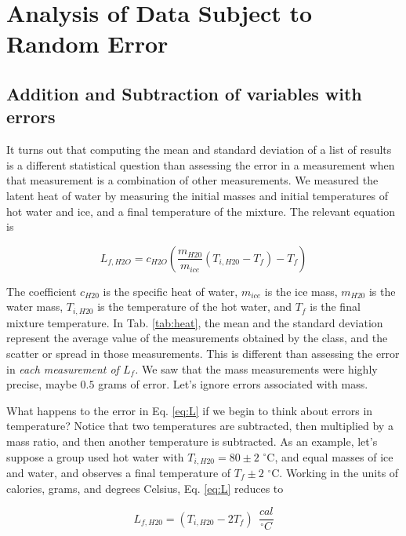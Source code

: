 \documentclass[12pt]{article}
\begin{document}
\section{Analysis of Data Subject to Random Error}

\subsection{Addition and Subtraction of variables with errors}

It turns out that computing the mean and standard deviation of a list of results is a different statistical question than assessing the error in a measurement when that measurement is a combination of other measurements.  We measured the latent heat of water by measuring the initial masses and initial temperatures of hot water and ice, and a final temperature of the mixture.  The relevant equation is

\begin{equation}
L_{f,H2O} = c_{H2O} \left( \frac{m_{H20}}{m_{ice}} (T_{i,H20} - T_f) - T_f \right) \label{eq:L}
\end{equation}

The coefficient $c_{H20}$ is the specific heat of water, $m_{ice}$ is the ice mass, $m_{H20}$ is the water mass, $T_{i,H20}$ is the temperature of the hot water, and $T_f$ is the final mixture temperature.  In Tab. \ref{tab:heat}, the mean and the standard deviation represent the average value of the measurements obtained by the class, and the scatter or spread in those measurements.  This is different than assessing the error in \textit{each measurement of $L_f$.}  We saw that the mass measurements were highly precise, maybe $0.5$ grams of error.  Let's ignore errors associated with mass.

What happens to the error in Eq. \ref{eq:L} if we begin to think about errors in temperature?  Notice that two temperatures are subtracted, then multiplied by a mass ratio, and then another temperature is subtracted.  As an example, let's suppose a group used hot water with $T_{i,H20} = 80\pm 2$ $^{\circ}$C, and equal masses of ice and water, and observes a final temperature of $T_f\pm 2$ $^{\circ}$C.  Working in the units of calories, grams, and degrees Celsius, Eq. \ref{eq:L} reduces to

\begin{equation}
L_{f,H20} = \left( T_{i,H20} - 2T_f\right)~~\frac{cal}{^{\circ}C} \label{eq:L2}
\end{equation}
\end{document}

